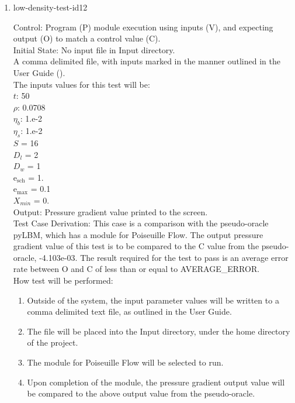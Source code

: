 \documentclass[12pt, titlepage]{article}
\begin{document}
\begin{enumerate}
\item{low-density-test-id12\\}

Control: Program (P) module execution using inputs (V), and expecting output (O) to match a control value (C).\\
					
Initial State: No input file in Input directory.\\
					
A comma delimited file, with inputs marked in the manner outlined in the User Guide (\citet{LBM_UserGuide_PM}).\\The inputs values for this test will be:\\
$t$: 50\\
$\rho$: 0.0708\\
$\eta_b$: 1.e-2\\
$\eta_s$: 1.e-2\\
$S$ = 16\\
$D_{l}$ = 2\\
$D_{w}$ = 1\\
$\mathrm{e_{sch}}$ = 1.\\
$\mathrm{e_{max}}$ = 0.1\\
$X_{min}$ = 0.\\

					
Output: Pressure gradient value printed to the screen. \\ 

Test Case Derivation: This case is a comparison with the pseudo-oracle pyLBM, which has a module for Poiseuille Flow. The output pressure gradient value of this test is to be compared to the C value from the pseudo-oracle, -4.103e-03. The result required for the test to pass is an average error rate between O and C of less than or equal to AVERAGE\_ERROR.\\

					
How test will be performed: 

\begin{enumerate}
\item Outside of the system, the input parameter values will be written to a comma delimited text file, as outlined in the User Guide.
\item The file will be placed into the Input directory, under the home directory of the project.
\item The module for Poiseuille Flow will be selected to run.
\item Upon completion of the module, the pressure gradient output value will be compared to the above output value from the pseudo-oracle.
\end{enumerate}	


\end{enumerate}
\end{document}
